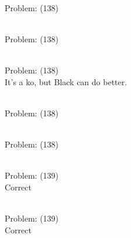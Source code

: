 \documentclass[11pt]{article}
\begin{document}
\begin{minipage}[t]{0.5\textwidth}
  {\centering
  
\\
Problem: (138)\\
  }
\end{minipage}
\begin{minipage}[t]{0.5\textwidth}
  {\centering
  
\\
Problem: (138)\\
  }
\end{minipage}
\begin{minipage}[t]{0.5\textwidth}
  {\centering
  
\\
Problem: (138)\\
It's a ko, but Black can do better.\\
  }
\end{minipage}
\begin{minipage}[t]{0.5\textwidth}
  {\centering
  
\\
Problem: (138)\\
  }
\end{minipage}
\begin{minipage}[t]{0.5\textwidth}
  {\centering
  
\\
Problem: (138)\\
  }
\end{minipage}
\begin{minipage}[t]{0.5\textwidth}
  {\centering
  
\\
Problem: (139)\\
Correct\\
  }
\end{minipage}
\begin{minipage}[t]{0.5\textwidth}
  {\centering
  
\\
Problem: (139)\\
Correct\\
  }
\end{minipage}
\end{document}

